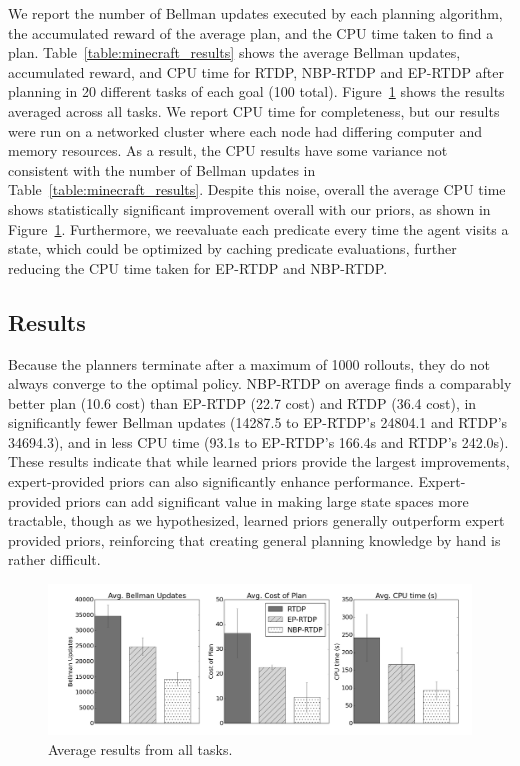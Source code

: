 \documentclass[11pt]{article}
\begin{document}
We report the number of Bellman updates executed by each planning
algorithm, the accumulated reward of the average plan, and the CPU
time taken to find a plan. Table~\ref{table:minecraft_results} shows
the average Bellman updates, accumulated reward, and CPU time for
RTDP, NBP-RTDP and EP-RTDP after planning in 20 different tasks of each
goal (100 total). Figure~\ref{fig:average_results} shows the
results averaged across all tasks.  We report CPU time for
completeness, but our results were run on a networked cluster where
each node had differing computer and memory resources. As a result,
the CPU results have some variance not consistent with the number of
Bellman updates in Table~\ref{table:minecraft_results}.  Despite this
noise, overall the average CPU time shows statistically significant
improvement overall with our priors, as shown in
Figure~\ref{fig:average_results}. Furthermore, we reevaluate each
predicate every time the agent visits a state, which could be optimized by caching predicate evaluations, further
reducing the CPU time taken for EP-RTDP and NBP-RTDP.

\subsection{Results}

Because the planners terminate after a maximum of 1000
rollouts, they do not always converge to the optimal policy. NBP-RTDP on
average finds a comparably better plan (10.6 cost) than EP-RTDP (22.7
cost) and RTDP (36.4 cost), in significantly fewer
Bellman updates (14287.5 to EP-RTDP's 24804.1 and RTDP's 34694.3), and in
less CPU time (93.1s to EP-RTDP's 166.4s and RTDP's 242.0s).  These
results indicate that while learned priors provide the largest
improvements, expert-provided priors can also significantly
enhance performance. Expert-provided priors can add
significant value in making large state spaces more tractable, though as we hypothesized,
learned priors generally outperform expert provided priors, reinforcing that creating
general planning knowledge by hand is rather difficult.
\begin{figure}[b]
\centering
\includegraphics[width=1\linewidth]{figures/avg_results.png}%
\caption{Average results from all tasks.}
\label{fig:average_results}
\end{figure}
\end{document}
